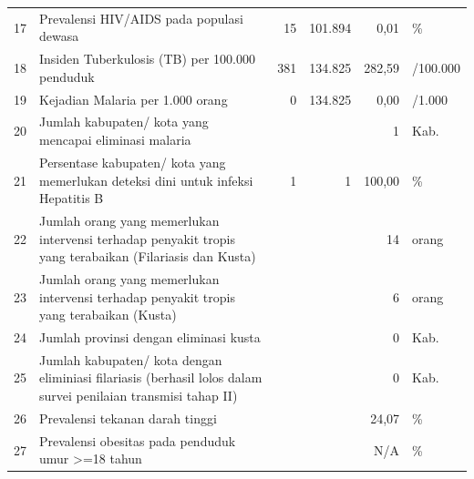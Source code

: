 \begin{center}
\begin{longtable}{rY{12em}rrrY{6em}}
                                     17 & Prevalensi HIV/AIDS pada populasi dewasa                                                                     					 &      15 & 101.894 &   0,01 & \%                  \\
                   18 & Insiden Tuberkulosis (TB) per 100.000 penduduk                                                                                 &     381 & 134.825 & 282,59 & /100.000            \\
                                     19 & Kejadian Malaria per 1.000 orang                                                                           					 &       0 & 134.825 &   0,00 & /1.000              \\
                   20 & Jumlah kabupaten/ kota yang mencapai eliminasi malaria                                                                         &         &         &      1 & Kab.                \\
                                     21 & Persentase kabupaten/ kota yang memerlukan deteksi dini untuk infeksi Hepatitis B                         					 &       1 &       1 & 100,00 & \%                  \\
                   22 & Jumlah orang yang memerlukan intervensi terhadap penyakit tropis yang terabaikan (Filariasis dan Kusta)                        &         &         &     14 & orang               \\
                                     23 & Jumlah orang yang memerlukan intervensi terhadap penyakit tropis yang terabaikan (Kusta)                     					 &         &         &      6 & orang               \\
                   24 & Jumlah provinsi dengan eliminasi kusta                                                                                         &         &         &      0 & Kab.                \\
                                     25 & Jumlah kabupaten/ kota dengan eliminiasi filariasis (berhasil lolos dalam survei penilaian transmisi tahap II) 				 &         &         &      0 & Kab.                \\
                   26 & Prevalensi tekanan darah tinggi                                                                                                &         &         &  24,07 & \%                  \\
                                     27 & Prevalensi obesitas pada penduduk umur >=18 tahun                                                           					 &         &         &    N/A & \%                  \\

\end{longtable}
\end{center}
